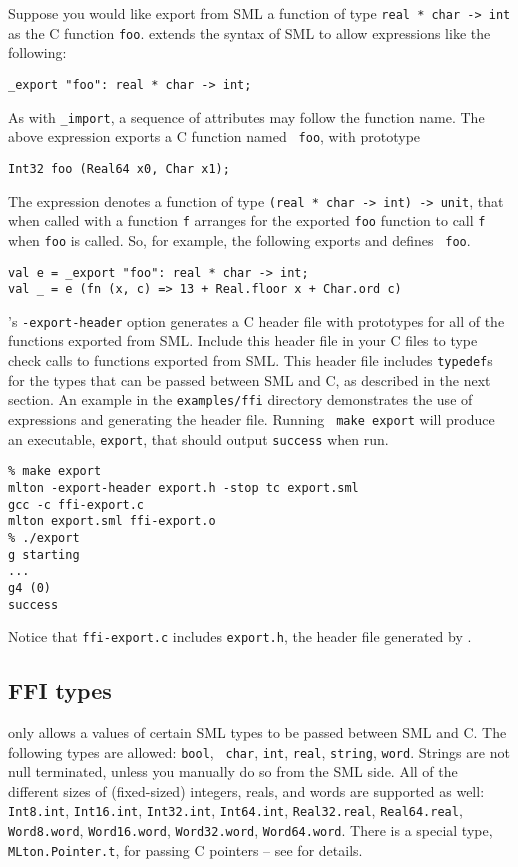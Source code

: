 Suppose you would like export from SML a function of type {\tt real *
char -> int} as the C function {\tt foo}.  {\mlton} extends the syntax
of SML to allow expressions like the following:
\begin{verbatim}
_export "foo": real * char -> int;
\end{verbatim}
As with {\tt \_import}, a sequence of attributes may follow the
function name.  The above expression exports a C function named {\tt
foo}, with prototype
\begin{verbatim}
Int32 foo (Real64 x0, Char x1);
\end{verbatim}
The {\export} expression denotes a function of type {\tt (real * char
-> int) -> unit}, that when called with a function {\tt f} arranges
for the exported {\tt foo} function to call {\tt f} when {\tt foo} is
called.  So, for example, the following exports and defines {\tt
foo}.
\begin{verbatim}
val e = _export "foo": real * char -> int;
val _ = e (fn (x, c) => 13 + Real.floor x + Char.ord c)
\end{verbatim}

{\mlton}'s {\tt -export-header} option generates a C header file with
prototypes for all of the functions exported from SML.  Include this
header file in your C files to type check calls to functions exported
from SML.  This header file includes {\tt typedef}s for the types that
can be passed between SML and C, as described in the next section.  An
example in the {\tt examples/ffi} directory demonstrates the use of
{\export} expressions and generating the header file.  Running {\tt
make export} will produce an executable, {\tt export}, that should
output {\tt success} when run.

\begin{verbatim}
% make export
mlton -export-header export.h -stop tc export.sml
gcc -c ffi-export.c
mlton export.sml ffi-export.o
% ./export
g starting
...
g4 (0)
success
\end{verbatim}
%
Notice that {\tt ffi-export.c} includes {\tt export.h}, the header
file generated by {\mlton}.
%
\subsection{FFI types}

{\mlton} only allows a values of certain SML types to be passed
between SML and C.  The following types are allowed: {\tt bool}, {\tt
char}, {\tt int}, {\tt real}, {\tt string}, {\tt word}.  Strings are
not null terminated, unless you manually do so from the SML side.  All
of the different sizes of (fixed-sized) integers, reals, and words are
supported as well: {\tt Int8.int}, {\tt Int16.int}, {\tt Int32.int},
{\tt Int64.int}, {\tt Real32.real}, {\tt Real64.real}, {\tt
Word8.word}, {\tt Word16.word}, {\tt Word32.word}, {\tt Word64.word}.
There is a special type, {\tt MLton.Pointer.t}, for passing C pointers
-- see  for details.


